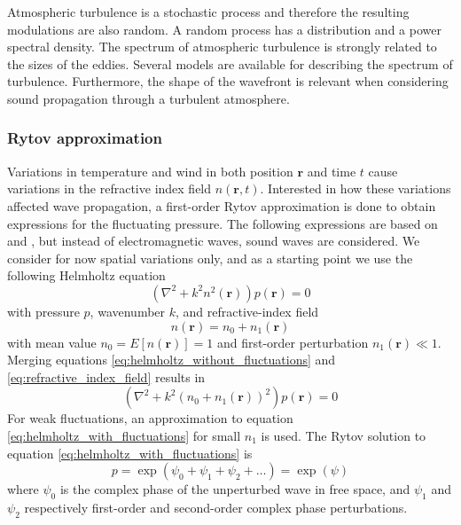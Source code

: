 Atmospheric turbulence is a stochastic process and therefore the resulting modulations are
also random. A random process has a distribution and a power spectral density.
The spectrum of atmospheric turbulence is strongly related to the sizes of the eddies.
Several models are available for describing the spectrum of turbulence.
Furthermore, the shape of the wavefront is relevant when considering sound
propagation through a turbulent atmosphere.


\subsubsection*{Rytov approximation}
Variations in temperature and wind in both position $\mathbf{r}$ and time $t$
cause variations in the refractive index field $n(\mathbf{r},t)$.
Interested in how these variations affected wave propagation, a first-order Rytov approximation is done to obtain expressions for the fluctuating pressure.
The following expressions are based on \cite{Ishimaru1997} and \cite{Jurado-navas2006}, but instead of electromagnetic
waves, sound waves are considered. We consider for now spatial variations only, and
as a starting point we use the following Helmholtz equation
\begin{equation}\label{eq:helmholtz_without_fluctuations}
 \left( \nabla^2 + k^2 n^2(\mathbf{r}) \right) p(\mathbf{r})= 0
\end{equation}
with pressure $p$, wavenumber $k$, and refractive-index field
\begin{equation}\label{eq:refractive_index_field}
 n(\mathbf{r}) = n_0 + n_1(\mathbf{r})
\end{equation}
with mean value $n_0 = E[n(\mathbf{r})] = 1$ and first-order perturbation $n_1(\mathbf{r}) \ll 1$. Merging equations \eqref{eq:helmholtz_without_fluctuations} and \eqref{eq:refractive_index_field} results in
\begin{equation}\label{eq:helmholtz_with_fluctuations}
 \left( \nabla^2 + k^2 (n_0 + n_1(\mathbf{r}))^2 \right) p(\mathbf{r}) = 0
\end{equation}
For weak fluctuations, an approximation to equation \eqref{eq:helmholtz_with_fluctuations} for small $n_1$ is used.
The Rytov solution to equation \eqref{eq:helmholtz_with_fluctuations} is
\begin{equation}
 p = \exp{\left(\psi_0 + \psi_1 + \psi_2 + \dots \right)} = \exp{(\psi)}
\end{equation}
where $\psi_0$ is the complex phase of the unperturbed wave in free space, and $\psi_1$ and $\psi_2$ respectively first-order and second-order complex phase perturbations.

